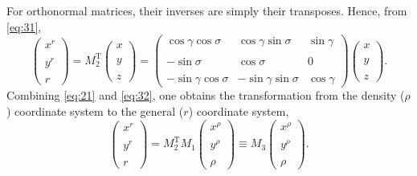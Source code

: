 \documentclass[12pt]{report}
\begin{document}
For orthonormal matrices, their inverses are simply their
transposes. Hence, from \eqref{eq:31},
\begin{equation}
\label{eq:32}
  \left(\begin{matrix} x^r\\ \\ y^r\\ \\ r\end{matrix}\right) =
  M_2^\textrm{T} \left(\begin{matrix}x \\ \\ y \\ \\
      z\end{matrix}\right) =
  \left(\begin{matrix}\cos\gamma\cos\sigma & \cos\gamma\sin\sigma &
      \sin\gamma \\ \\
  -\sin\sigma & \cos\sigma & 0\\ \\
  -\sin\gamma\cos\sigma & -\sin\gamma\sin\sigma &
  \cos\gamma\end{matrix}\right)  
  \left(\begin{matrix}x \\ \\ y \\ \\ z\end{matrix}\right).
\end{equation}
Combining \eqref{eq:21} and \eqref{eq:32}, one obtains the
transformation from the density ($\rho$) coordinate system to the
general ($r$) coordinate system,
\begin{equation}
\label{eq:33}
  \left(\begin{matrix} x^r\\ \\ y^r\\ \\ r\end{matrix}\right) =
  M_2^\textrm{T} M_1\left(\begin{matrix}x^\rho \\ \\ y^\rho \\ \\
      \rho\end{matrix}\right) \equiv M_3\left(\begin{matrix}x^\rho \\
      \\ y^\rho \\ \\ \rho\end{matrix}\right).
\end{equation}
\end{document}
